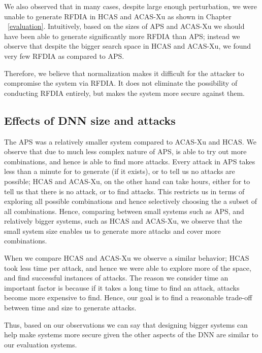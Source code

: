 We also observed that in many cases, despite large enough perturbation, we were unable to generate \ac{RFDIA} in \ac{HCAS} and \ac{ACAS-Xu} as shown in Chapter ~\ref{evaluation}.
Intuitively, based on the sizes of \ac{APS} and \ac{ACAS-Xu} we should have been able to generate significantly more \ac{RFDIA} than \ac{APS}; instead we observe that despite the bigger search space in \ac{HCAS} and \ac{ACAS-Xu}, we found very few \ac{RFDIA} as compared to \ac{APS}. 

Therefore, we believe that normalization makes it difficult for the attacker to compromise the system via \ac{RFDIA}. 
It does not eliminate the possibility of conducting \ac{RFDIA} entirely, but makes the system more secure against them. 

\subsection{Effects of DNN size and attacks}
The \ac{APS} was a relatively smaller system compared to \ac{ACAS-Xu} and \ac{HCAS}.
We observe that due to much less complex nature of \ac{APS}, \tool is able to try out more combinations, and hence is able to find more attacks. 
Every attack in \ac{APS} takes less than a minute for \tool to generate (if it exists), or to tell us no attacks are possible; 
\ac{HCAS} and \ac{ACAS-Xu}, on the other hand can take hours, either for \tool to tell us that there is no attack, or to find attacks.
This restricts us in terms of exploring all possible combinations and hence selectively choosing the a subset of all combinations. 
Hence, comparing between small systems such as \ac{APS}, and relatively bigger systems, such as \ac{HCAS} and \ac{ACAS-Xu}, we observe that the small system size enables us to generate more attacks and cover more combinations. 

When we compare \ac{HCAS} and \ac{ACAS-Xu} we observe a similar behavior; \ac{HCAS} took less time per attack, and hence we were able to explore more of the space, and find successful instances of attacks. 
The reason we consider time an important factor is because if it takes a long time to find an attack, attacks become more expensive to find. 
Hence, %
our goal is to find a reasonable trade-off between time and size to generate attacks. 

Thus, based on our observations we can say that designing bigger systems can help make systems more secure given the other aspects of the \ac{DNN} are similar to our evaluation systems. 


